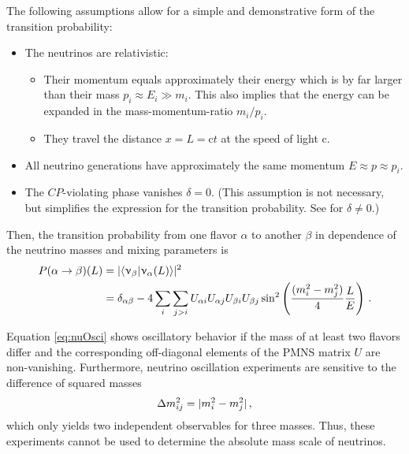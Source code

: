 The following assumptions allow for a simple and demonstrative form of the transition probability:
\begin{itemize}
    \renewcommand{\labelitemi}{$\bullet$}
    \renewcommand{\labelitemii}{$\circ$}
    \item The neutrinos are relativistic: 
    \begin{itemize}
        \item Their momentum equals approximately their energy which is by far larger than their mass $p_i \approx E_i \gg m_i$. This also implies that the energy can be expanded in the mass-momentum-ratio $m_i/p_i$.
        \item They travel the distance $x=L=\mathrm{c}t$ at the speed of light $\mathrm{c}$.
    \end{itemize}
    \item All neutrino generations have approximately the same momentum $E \approx p \approx p_i$.
    \item The $CP$-violating phase vanishes $\delta=0$. (This assumption is not necessary, but simplifies the expression for the transition probability. See \cite{zuber2011neutrino} for $\delta \neq 0$.)
\end{itemize}
Then, the transition probability from one flavor $\alpha$ to another $\beta$ in dependence of the neutrino masses and mixing parameters is
\begin{equation}
    \begin{split}
    P(\alpha \rightarrow \beta)(L) 
    &= \lvert\left\langle\upnu_\beta \middle| \upnu_\alpha(L)\right\rangle\rvert^2 \\
    &= 
    \delta_{\alpha\beta}-
    4\sum_{i}\sum_{j>i} U_{\alpha i} U_{\alpha j} U_{\beta i} U_{\beta j} 
    \sin^2\left( \frac{(m_i^2-m_j^2)}{4} \frac{L}{E} \right)
    \text{\,.}
    \end{split}
    \label{eq:nuOsci}
\end{equation}

Equation \eqref{eq:nuOsci} shows oscillatory behavior if the mass of at least two flavors differ and the corresponding off-diagonal elements of the PMNS matrix $U$ are non-vanishing. Furthermore, neutrino oscillation experiments are sensitive to the difference of squared masses 
\begin{equation}
    \label{eq:massSquaredDiff}
    \Delta m^2_{ij} =  \lvert m^2_i - m^2_j\rvert
    \text{\,,}
\end{equation}
which only yields two independent observables for three masses. Thus, these experiments cannot be used to determine the absolute mass scale of neutrinos.

